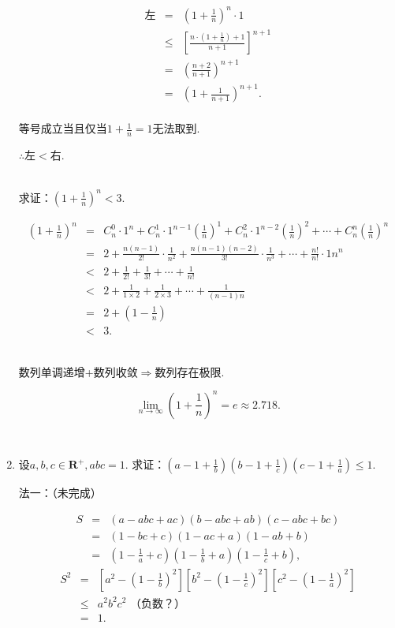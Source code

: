 \documentclass[8pt]{article}
\begin{document}
\begin{enumerate}
			$$
			\begin{array}{rcl}
				\text{左}&=&\left(1+\frac{1}{n}\right)^n\cdot 1\\
				&\leq&\left[\frac{n\cdot\left(1+\frac{1}{n}\right)+1}{n+1}\right]^{n+1}\\
				&=&\left(\frac{n+2}{n+1}\right)^{n+1}\\
				&=&\left(1+\frac{1}{n+1}\right)^{n+1}.\\
			\end{array}
			$$

			等号成立当且仅当$1+\frac{1}{n}=1$无法取到.

			$\therefore$左$<$右.

			~\\

			求证：$\left(1+\frac{1}{n}\right)^n<3.$

			$$
			\begin{array}{rcl}
				\left(1+\frac{1}{n}\right)^n&=&C_n^0\cdot 1^n + C_n^1\cdot1^{n-1} \left(\frac{1}{n}\right)^1 + C_n^2\cdot1^{n-2} \left(\frac{1}{n}\right)^2 + \cdots + C_n^n \left(\frac{1}{n}\right)^n\\
				&=&2+\frac{n(n-1)}{2!}\cdot\frac{1}{n^2}+\frac{n(n-1)(n-2)}{3!}\cdot\frac{1}{n^3}+\cdots+\frac{n!}{n!}\cdot{1}{n^n}\\
				&<&2+\frac{1}{2!}+\frac{1}{3!}+\cdots+\frac{1}{n!}\\
				&<&2+\frac{1}{1\times2}+\frac{1}{2\times3}+\cdots+\frac{1}{(n-1)n}\\
				&=&2+\left(1-\frac{1}{n}\right)\\
				&<&3.
			\end{array}
			$$

			~\\

			数列单调递增+数列收敛$\Rightarrow$数列存在极限.

			$$
			\lim_{n\rightarrow \infty}{\left(1+\frac{1}{n}\right)^n}=e\approx 2.718.
			$$

		~\\

		\item 设$a, b, c\in\mathbf{R}^{+}, abc=1$. 求证：$\left(a-1+\frac{1}{b}\right)\left(b-1+\frac{1}{c}\right)\left(c-1+\frac{1}{a}\right)\leq 1$.

			法一：（未完成）

			$$
			\begin{array}{rcl}
				S&=&(a-abc+ac)(b-abc+ab)(c-abc+bc)\\
				&=&(1-bc+c)(1-ac+a)(1-ab+b)\\
				&=&\displaystyle\left(1-\frac{1}{a}+c\right)\left(1-\frac{1}{b}+a\right)\left(1-\frac{1}{c}+b\right),
			\end{array}
			$$
			$$
			\begin{array}{rcl}
				S^2&=&\displaystyle\left[a^2-\left(1-\frac{1}{b}\right)^2\right]\left[b^2-\left(1-\frac{1}{c}\right)^2\right]\left[c^2-\left(1-\frac{1}{a}\right)^2\right]\\
				&\leq&a^2b^2c^2\text{ （负数？）}\\
				&=&1.
			\end{array}
			$$


\end{enumerate}
\end{document}
